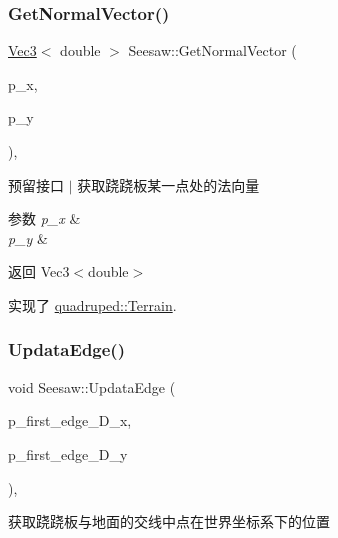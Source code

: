 \subsubsection{\texorpdfstring{Get\+Normal\+Vector()}{GetNormalVector()}}
{\footnotesize\ttfamily \hyperlink{cppTypes_8h_a65c27bf97693676535dd0b30ea0ad399}{Vec3}$<$ double $>$ Seesaw\+::\+Get\+Normal\+Vector (\begin{DoxyParamCaption}\item[{double}]{p\+\_\+x,  }\item[{double}]{p\+\_\+y }\end{DoxyParamCaption})\hspace{0.3cm}{\ttfamily [override]}, {\ttfamily [virtual]}}



预留接口 $\vert$ 获取跷跷板某一点处的法向量 


\begin{DoxyParams}{参数}
{\em p\+\_\+x} & \\
\hline
{\em p\+\_\+y} & \\
\hline
\end{DoxyParams}
\begin{DoxyReturn}{返回}
Vec3$<$double$>$ 
\end{DoxyReturn}


实现了 \hyperlink{classquadruped_1_1Terrain}{quadruped\+::\+Terrain}.

\mbox{\label{classquadruped_1_1Seesaw_afe71a03188bcc6bbd385356f8c5d10b3}} 
\subsubsection{\texorpdfstring{Updata\+Edge()}{UpdataEdge()}}
{\footnotesize\ttfamily void Seesaw\+::\+Updata\+Edge (\begin{DoxyParamCaption}\item[{double}]{p\+\_\+first\+\_\+edge\+\_\+\+D\+\_\+x,  }\item[{double}]{p\+\_\+first\+\_\+edge\+\_\+\+D\+\_\+y }\end{DoxyParamCaption})\hspace{0.3cm}{\ttfamily [override]}, {\ttfamily [virtual]}}



获取跷跷板与地面的交线中点在世界坐标系下的位置 


